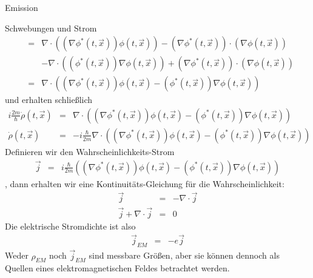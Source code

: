 \begin{chapter}{\titlestr}
\begin{section}{Emission}
\begin{subsection}{Schwebungen und Strom}
\begin{eqnarray*}
&=&\nabla\cdot\left(\left(\nabla\phi^*(t,\vec{x})\right)\phi(t,\vec{x})\right)-\left(\nabla\phi^*(t,\vec{x})\right)\cdot\left(\nabla\phi(t,\vec{x})\right)\\
&&-\nabla\cdot\left(\left(\phi^*(t,\vec{x})\right)\nabla\phi(t,\vec{x})\right)+\left(\nabla\phi^*(t,\vec{x})\right)\cdot\left(\nabla\phi(t,\vec{x})\right)\\
&=&\nabla\cdot\left(\left(\nabla\phi^*(t,\vec{x})\right)\phi(t,\vec{x})-\left(\phi^*(t,\vec{x})\right)\nabla\phi(t,\vec{x})\right)
\end{eqnarray*}
und erhalten schließlich
\begin{eqnarray*}
i\frac{2m}{\hbar}\dot{\rho}(t,\vec{x})&=&\nabla\cdot\left(\left(\nabla\phi^*(t,\vec{x})\right)\phi(t,\vec{x})-\left(\phi^*(t,\vec{x})\right)\nabla\phi(t,\vec{x})\right)\\
\dot{\rho}(t,\vec{x})&=&-i\frac{\hbar}{2m}\nabla\cdot\left(\left(\nabla\phi^*(t,\vec{x})\right)\phi(t,\vec{x})-\left(\phi^*(t,\vec{x})\right)\nabla\phi(t,\vec{x})\right)
\end{eqnarray*}
Definieren wir den Wahrscheinlichkeits-Strom
\begin{eqnarray*}
\vec{j} &=& i\frac{\hbar}{2m}\left(\left(\nabla\phi^*(t,\vec{x})\right)\phi(t,\vec{x})-\left(\phi^*(t,\vec{x})\right)\nabla\phi(t,\vec{x})\right)
\end{eqnarray*}
, dann erhalten wir eine Kontinuitäts-Gleichung für die Wahrscheinlichkeit:
\begin{eqnarray*}
\vec{j} &=& -\nabla\cdot\vec{j}\\
\vec{j}+\nabla\cdot\vec{j} &=& 0
\end{eqnarray*}
Die elektrische Stromdichte ist also
\begin{eqnarray*}
\vec{j}_{EM} &=& -e\vec{j}
\end{eqnarray*}
Weder $\rho_{EM}$ noch $\vec{j}_{EM}$ sind messbare Größen, aber sie können dennoch als Quellen eines elektromagnetischen Feldes betrachtet werden.


\end{subsection}
\end{section}
\end{chapter}
